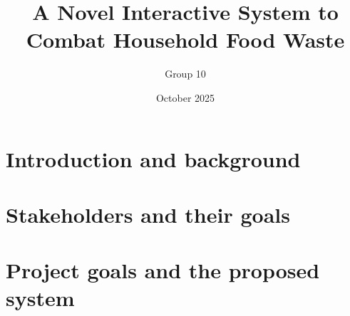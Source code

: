 \documentclass[manuscript]{acmart}
\title{A Novel Interactive System to Combat Household Food Waste}
\author{Group 10 }
\date{October 2025}
\begin{document}
\maketitle

\tableofcontents
\newpage



\newpage
\section{Introduction and background}

\label{sec:introduction}


\newpage
\section{Stakeholders and their goals}
\label{sec:stakeholders}



\newpage

\section{Project goals and the proposed system}

\label{sec:project-goals}
\end{document}
